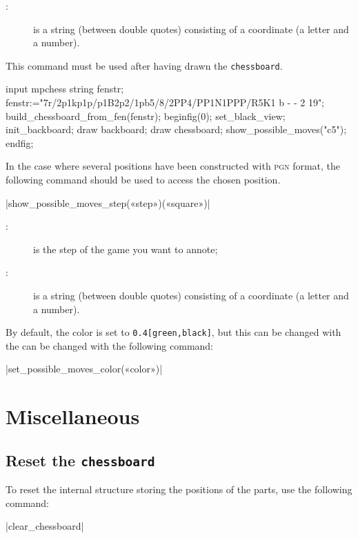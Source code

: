 \documentclass[english]{ltxdoc}
\begin{document}
\begin{description}
\item[:] is a string (between double quotes) consisting
of a coordinate (a letter and a number). 
\end{description}

This command must be used after having drawn the  \lstinline+chessboard+.

\begin{ExempleMP}
  input mpchess
  string fenstr;
  fenstr:="7r/2p1kp1p/p1B2p2/1pb5/8/2PP4/PP1N1PPP/R5K1 b - - 2 19";
  build_chessboard_from_fen(fenstr);
  beginfig(0);
  set_black_view;
  init_backboard;
  draw backboard;
  draw chessboard;
  show_possible_moves("c5");
  endfig;
\end{ExempleMP}  

In the case where several positions have been constructed with \textsc{pgn}
format, the following command should be used to access the chosen position. 

\commande|show_possible_moves_step(«step»)(«square»)|\smallskip

\begin{description}
  \item[:] is the step of the game you want to annote;
  \item[:] is a string (between double quotes) consisting
of a coordinate (a letter and a number).
\end{description}

By default, the color is set to \lstinline+0.4[green,black]+, but this can be changed with the can be changed with the following command:

\commande|set_possible_moves_color(«color»)|\smallskip

\section{Miscellaneous}

\subsection{Reset the \lstinline+chessboard+}

To reset the internal structure storing the positions of the parts,  use
the following command:


\commande|clear_chessboard|\smallskip
\end{document}
